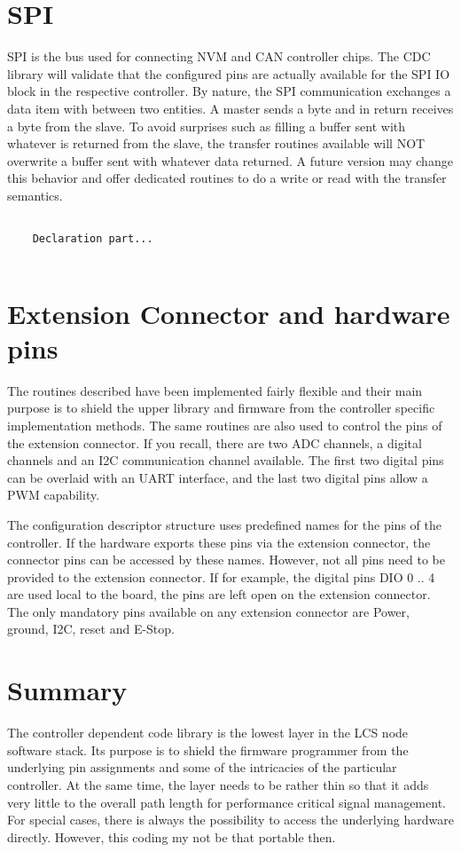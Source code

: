 \section{SPI}

SPI is the bus used for connecting NVM and CAN controller chips. The CDC library will validate that the configured pins are actually available for the SPI IO block in the respective controller. By nature, the SPI communication exchanges a data item with between two entities. A master sends a byte and in return receives a byte from the slave. To avoid surprises such as filling a buffer sent with whatever is returned from the slave, the transfer routines available will NOT overwrite a buffer sent with whatever data returned. A future version may change this behavior and offer dedicated routines to do a write or read with the transfer semantics.

\lstset{language=c++, style=codesnippetstyle}
\begin{lstlisting}
   
    Declaration part...
    
\end{lstlisting}

\section{Extension Connector and hardware pins}

The routines described have been implemented fairly flexible and their main purpose is to shield the upper library and firmware from the controller specific implementation methods. The same routines are also used to control the pins of the extension connector. If you recall, there are two ADC channels, a digital channels and an I2C communication channel available. The first two digital pins can be overlaid with an UART interface, and the last two digital pins allow a PWM capability.

The configuration descriptor structure uses predefined names for the pins of the controller. If the hardware exports these pins via the extension connector, the connector pins can be accessed by these names. However, not all pins need to be provided to the extension connector. If for example, the digital pins DIO 0 .. 4 are used local to the board, the pins are left open on the extension connector. The only mandatory pins available on any extension connector are Power, ground, I2C, reset and E-Stop.

\section{Summary}

The controller dependent code library is the lowest layer in the LCS node software stack. Its purpose is to shield the firmware programmer from the underlying pin assignments and some of the intricacies of the particular controller. At the same time, the layer needs to be rather thin so that it adds very little to the overall path length for performance critical signal management. For special cases, there is always the possibility to access the underlying hardware directly. However, this coding my not be that portable then.

